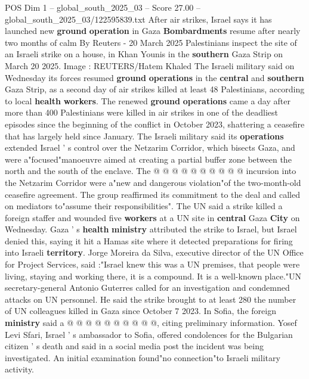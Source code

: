 \begin{textsample}{POS Dim 1 – global\_south\_2025\_03 – Score 27.00 – global\_south\_2025\_03/122595839.txt}  \label{ex:f1_pos_267}
After air strikes, Israel says it has launched new \textbf{ground} \textbf{operation} in Gaza \textbf{Bombardments} resume after nearly two months of calm By Reuters - 20 March 2025 Palestinians inspect the site of an Israeli strike on a house, in Khan Younis in the \textbf{southern} Gaza Strip on March 20 2025.
Image : REUTERS/Hatem Khaled The Israeli military said on Wednesday its forces resumed \textbf{ground} \textbf{operations} in the \textbf{central} and \textbf{southern} Gaza Strip, as a second day of air strikes killed at least 48 Palestinians, according to local \textbf{health} \textbf{workers}.
The renewed \textbf{ground} \textbf{operations} came a day after more than 400 Palestinians were killed in air strikes in one of the deadliest episodes since the beginning of the conflict in October 2023, shattering a ceasefire that has largely held since January.
The Israeli military said its \textbf{operations} extended Israel ' s control over the Netzarim Corridor, which bisects Gaza, and were a"focused"manoeuvre aimed at creating a partial buffer zone between the north and the south of the enclave.
The @ @ @ @ @ @ @ @ @ @ incursion into the Netzarim Corridor were a"new and dangerous violation"of the two-month-old ceasefire agreement.
The group reaffirmed its commitment to the deal and called on mediators to"assume their responsibilities".
The UN said a strike killed a foreign staffer and wounded five \textbf{workers} at a UN site in \textbf{central} Gaza \textbf{City} on Wednesday.
Gaza ' s \textbf{health} \textbf{ministry} attributed the strike to Israel, but Israel denied this, saying it hit a Hamas site where it detected preparations for firing into Israeli \textbf{territory}.
Jorge Moreira da Silva, executive director of the UN Office for Project Services, said :"Israel knew this was a UN premises, that people were living, staying and working there, it is a compound.
It is a well-known place."UN secretary-general Antonio Guterres called for an investigation and condemned attacks on UN personnel.
He said the strike brought to at least 280 the number of UN colleagues killed in Gaza since October 7 2023.
In Sofia, the foreign \textbf{ministry} said a @ @ @ @ @ @ @ @ @ @, citing preliminary information.
Yosef Levi Sfari, Israel ' s ambassador to Sofia, offered condolences for the Bulgarian citizen ' s death and said in a social media post the incident was being investigated.
An initial examination found"no connection"to Israeli military activity.

\end{textsample}
